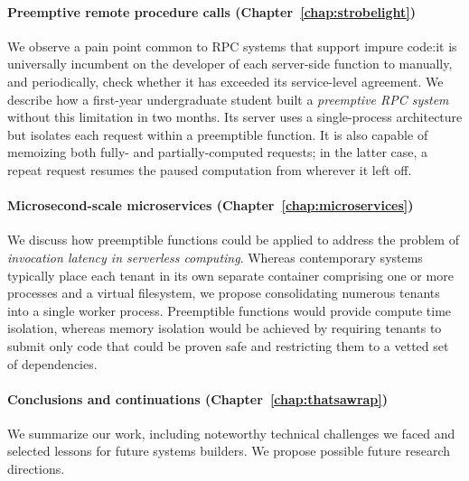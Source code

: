 \paragraph{Preemptive remote procedure calls (Chapter~\ref{chap:strobelight})}
We observe a pain point common to RPC systems that support impure code:\@ it is
universally incumbent on the developer of each server-side function to manually, and
periodically, check whether it has exceeded its service-level agreement.  We describe
how a first-year undergraduate student built a \textit{preemptive RPC system} without
this limitation in two months.  Its server uses a single-process architecture but
isolates each request within a preemptible function.  It is also capable of memoizing
both fully- and partially-computed requests; in the latter case, a repeat request
resumes the paused computation from wherever it left off.

\paragraph{Microsecond-scale microservices (Chapter~\ref{chap:microservices})}
We discuss how preemptible functions could be applied to address the problem of
\textit{invocation latency in serverless computing}.  Whereas contemporary systems
typically
place each tenant in its own separate container comprising one or more processes and
a virtual filesystem, we propose consolidating numerous tenants into a single worker
process.  Preemptible functions would provide compute time isolation, whereas memory
isolation would be achieved by requiring tenants to submit only code that could be
proven safe and restricting them to a vetted set of dependencies.

\paragraph{Conclusions and continuations (Chapter~\ref{chap:thatsawrap})}
We summarize our work, including noteworthy technical challenges we faced and
selected lessons for future systems builders.  We propose possible future research
directions.
